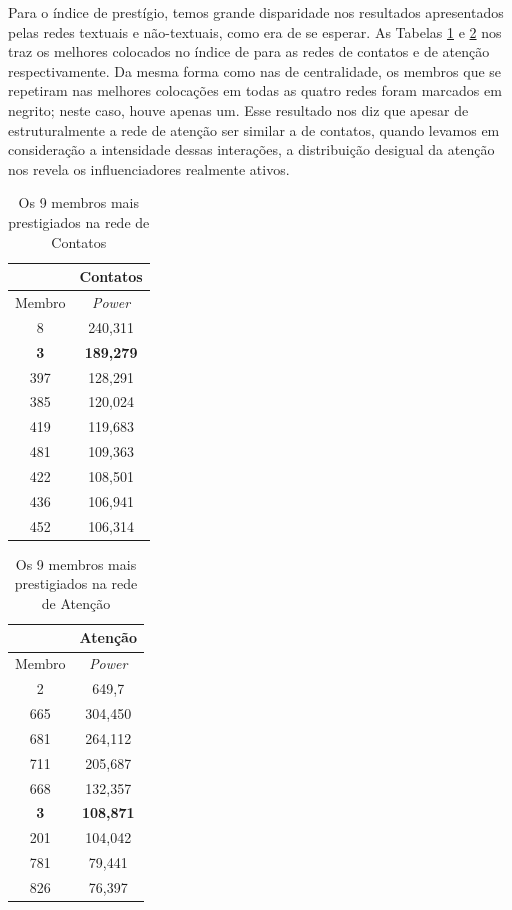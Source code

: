 Para o índice de prestígio, temos grande disparidade nos resultados apresentados
pelas redes textuais e não-textuais, como era de se esperar. As Tabelas
\ref{ap:tab:prest-contato} e \ref{ap:tab:prest-completa} nos traz os melhores
colocados no índice de \citeauthor{Bonacich1987} para as redes de contatos e de
atenção respectivamente. Da mesma forma como nas de centralidade, os membros que
se repetiram nas melhores colocações em todas as quatro redes foram marcados em
negrito; neste caso, houve apenas um. Esse resultado nos diz que apesar de
estruturalmente a rede de atenção ser similar a de contatos, quando levamos em
consideração a intensidade dessas interações, a distribuição desigual da atenção
nos revela os influenciadores realmente ativos.

\begin{table}[htbp]
	\large       %
	\setlength{\arrayrulewidth}{2\arrayrulewidth}  %
	\setlength{\belowcaptionskip}{10pt}  %
	\caption{Os 9 membros mais prestigiados na rede de Contatos} \centering   
	\begin{tabular}{| c | c |}
	\hline
	\citeauthor{Bonacich1987} & Contatos\\ \hline\hline
	Membro & \emph{Power} \\ \hline
	8 & 240,311 \\
	\textbf{3} & \textbf{189,279} \\
	397 & 128,291 \\
	385 & 120,024 \\
	419 & 119,683 \\
 	481 & 109,363 \\
 	422 & 108,501 \\
 	436 & 106,941 \\ 
 	452 & 106,314 \\\hline
	\end{tabular}
	\label{ap:tab:prest-contato}
\end{table}

\begin{table}[htbp]
	\large       %
	\setlength{\arrayrulewidth}{2\arrayrulewidth}  %
	\setlength{\belowcaptionskip}{10pt}  %
	\caption{Os 9 membros mais prestigiados na rede de Atenção} \centering   
	\begin{tabular}{| c | c |}
	\hline
	\citeauthor{Bonacich1987} & Atenção\\ \hline\hline
	Membro & \emph{Power} \\ \hline
	2 & 649,7 \\
	665 & 304,450 \\
	681 & 264,112 \\
	711 & 205,687 \\
	668 & 132,357 \\
	\textbf{3} & \textbf{108,871} \\
	201 & 104,042 \\
	781 & 79,441 \\
	826 & 76,397 \\\hline
	\end{tabular}
	\label{ap:tab:prest-completa}
\end{table}

